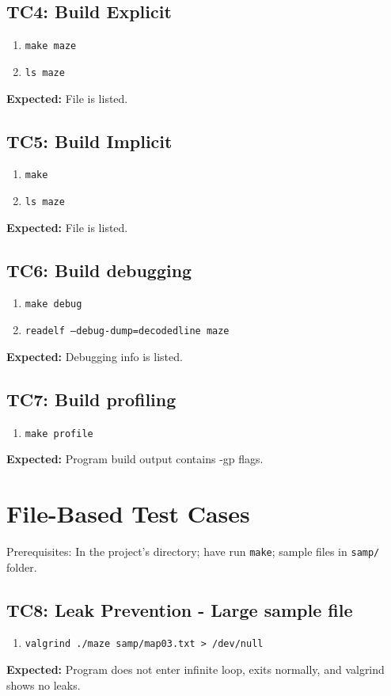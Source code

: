 \documentclass[11pt]{report}
\begin{document}
\subsection*{TC4: Build Explicit}
\begin{enumerate}
  \item {\texttt{\color{red}make maze}}
  \item {\texttt{\color{red}ls maze}}
\end{enumerate}
\textbf{Expected:} File is listed.
\subsection*{TC5: Build Implicit}
\begin{enumerate}
  \item {\texttt{\color{red}make}}
  \item {\texttt{\color{red}ls maze}}
\end{enumerate}
\textbf{Expected:} File is listed.
\subsection*{TC6: Build debugging}
\begin{enumerate}
  \item {\texttt{\color{red}make debug}}
  \item {\texttt{\color{red}readelf --debug-dump=decodedline maze}}
\end{enumerate}
\textbf{Expected:} Debugging info is listed.
\subsection*{TC7: Build profiling}
\begin{enumerate}
  \item {\texttt{\color{red}make profile}}
\end{enumerate}
\textbf{Expected:} Program build output contains -gp flags.
\pagebreak
\section*{File-Based Test Cases}
Prerequisites: In the project's directory; have run {\texttt{\color{red}make}}; sample files in {\texttt{\color{red}samp/}} folder.
\subsection*{TC8: Leak Prevention - Large sample file}
\begin{enumerate}
  \item {\texttt{\color{red}valgrind ./maze samp/map03.txt > /dev/null}}
\end{enumerate}
\textbf{Expected:} Program does not enter infinite loop, exits normally, and valgrind shows no leaks.
\end{document}
